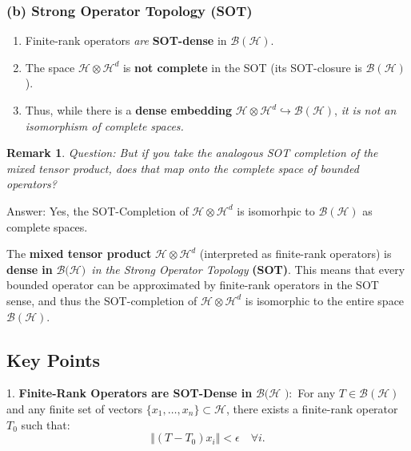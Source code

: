 \documentclass[aps,preprint]{revtex4}
\newtheorem{remark}[theorem]{Remark}
\begin{document}
\subsubsection*{(b) Strong Operator Topology (SOT)}

\begin{enumerate}
\item Finite-rank operators \emph{are} \textbf{SOT-dense} in $\mathcal{B}(%
\mathcal{H})$.

\item The space $\mathcal{H}\otimes \mathcal{H}^{d}$ is \textbf{not complete}
in the SOT (its SOT-closure is $\mathcal{B}(\mathcal{H})$).

\item Thus, while there is a \textbf{dense embedding} $\mathcal{H}\otimes 
\mathcal{H}^{d}\hookrightarrow \mathcal{B}(\mathcal{H})$, \emph{it is not an
isomorphism of complete spaces.}
\end{enumerate}

\begin{remark}
Question: But if you take the analogous SOT completion of the mixed tensor
product, does that map onto the complete space of bounded operators?
\end{remark}

Answer: Yes, the SOT-Completion of $\mathcal{H}\otimes \mathcal{H}^{d}$ is
isomorhpic to $\mathcal{B}(\mathcal{H})$ as complete spaces.

The \textbf{mixed tensor product} $\mathcal{H}\otimes \mathcal{H}^{d}$
(interpreted as finite-rank operators) is \textbf{dense in }$\mathcal{B}(%
\mathcal{H}$\textbf{$)$}\emph{\ in the Strong Operator Topology} \textbf{%
(SOT)}. This means that every bounded operator can be approximated by
finite-rank operators in the SOT sense, and thus the SOT-completion of $%
\mathcal{H}\otimes \mathcal{H}^{d}$ is isomorphic to the entire space $%
\mathcal{B}(\mathcal{H})$.

\subsection*{Key Points}

1. \textbf{Finite-Rank Operators are SOT-Dense in }$\mathcal{B}(\mathcal{H}$%
\textbf{$):$} For any $T\in \mathcal{B}(\mathcal{H})$ and any finite set of
vectors $\{x_{1},\dots ,x_{n}\}\subset \mathcal{H}$, there exists a
finite-rank operator $T_{0}$ such that: 
\begin{equation*}
\Vert (T-T_{0})x_{i}\Vert <\epsilon \quad \forall i.
\end{equation*}
\end{document}
